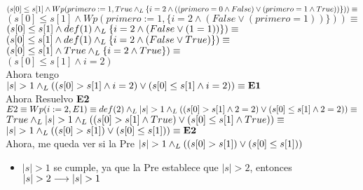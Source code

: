 \documentclass[10pt,a4paper]{article}
\begin{document}
\begin{enumerate}
\\
$(s[0] \leq s[1] \land Wp(primero:= 1, True \land _L \{i = 2 \land ((primero = 0 \land False) \lor (primero = 1 \land True))\}))\equiv$
\vspace{0.3cm}
\\
$(s[0] \leq s[1] \land Wp(primero:= 1, \{i = 2 \land (False \lor (primero = 1))\}))\equiv$
\vspace{0.3cm}
\\
$(s[0] \leq s[1] \land def(1) \land _L\{i = 2 \land (False \lor (1 = 1))\})\equiv$
\vspace{0.3cm}
\\
$(s[0] \leq s[1] \land def(1) \land _L\{i = 2 \land (False \lor True)\})\equiv$
\vspace{0.3cm}
\\
$(s[0] \leq s[1] \land True \land _L\{i = 2 \land True\})\equiv$
\vspace{0.3cm}
\\
$(s[0] \leq s[1] \land i = 2 )$
\vspace{0.3cm}
\\
Ahora tengo
\vspace{0.3cm}
\\
$|s| > 1 \land _L ((s[0] > s[1] \land i = 2) \lor (s[0] \leq s[1] \land i = 2)) \equiv \textbf{E1}$
\vspace{0.3cm}
\\
Ahora Resuelvo \textbf{E2}
\vspace{0.3cm}
\\
$E2 \equiv Wp(i:= 2, E1) \equiv def(2) \land _L |s| > 1 \land _L ((s[0] > s[1] \land 2 = 2) \lor (s[0] \leq s[1] \land 2 = 2)) \equiv$
\vspace{0.3cm}
\\
$True \land _L |s| > 1 \land _L ((s[0] > s[1] \land True) \lor (s[0] \leq s[1] \land True)) \equiv$
\vspace{0.3cm}
\\
$|s| > 1 \land _L ((s[0] > s[1]) \lor (s[0] \leq s[1] )) \equiv \textbf{E2}$
\vspace{0.3cm}
\\
Ahora, me queda ver si la Pre \implica $|s| > 1 \land _L ((s[0] > s[1]) \lor (s[0] \leq s[1] ))$
\begin{itemize}
\item$|s| > 1$ se cumple, ya que la Pre establece que $|s| > 2$, entonces $|s| > 2 \longrightarrow |s| > 1$


\end{itemize}
\end{enumerate}
\end{document}
